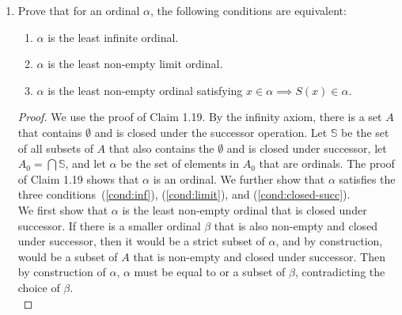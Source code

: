 \documentclass{article}
\begin{document}
\begin{enumerate}
\begin{proof}
      Now we show that $\alpha$ is the least ordinal satisfying this
      property. Let $\beta$ be an ordinal smaller than $\alpha=\cup X$. By
      Theorem 1.14.3, $\beta$ must be contained in $\alpha$, which means it
      is contained in some ordinal $x$ in $X$. By Theorem 1.14.3 again,
      $\beta$ cannot be larger or equal to $x$.
    \end{proof}

  \item Prove that for an ordinal $\alpha$, the following conditions are
    equivalent:
    \begin{enumerate}
      \item $\alpha$ is the least infinite ordinal. \label{cond:inf}
      \item $\alpha$ is the least non-empty limit ordinal.
        \label{cond:limit}
      \item $\alpha$ is the least non-empty ordinal satisfying
        $x\in\alpha\implies S(x)\in\alpha$. \label{cond:closed-succ}
    \end{enumerate}

    \begin{proof}
      We use the proof of Claim 1.19. By the infinity axiom, there is a
      set $A$ that contains $\emptyset$ and is closed under the successor
      operation. Let $\mathbb{S}$ be the set of all subsets of $A$ that also
      contains the $\emptyset$ and is closed under successor, let
      $A_0=\bigcap\mathbb{S}$, and let $\alpha$ be the set of elements in
      $A_0$ that are ordinals. The proof of Claim 1.19 shows that $\alpha$
      is an ordinal. We further show that $\alpha$ satisfies the three
      conditions~(\ref{cond:inf}), (\ref{cond:limit}), and
      (\ref{cond:closed-succ}). \\

      We first show that $\alpha$ is the least non-empty ordinal that is
      closed under successor. If there is a smaller ordinal $\beta$ that is
      also non-empty and closed under successor, then it would be a
      strict subset of $\alpha$, and by construction, would be a subset of
      $A$ that is non-empty and closed under successor. Then by
      construction of $\alpha$, $\alpha$ must be equal to or a subset of
      $\beta$, contradicting the choice of $\beta$. \\


\end{proof}
\end{enumerate}
\end{document}
